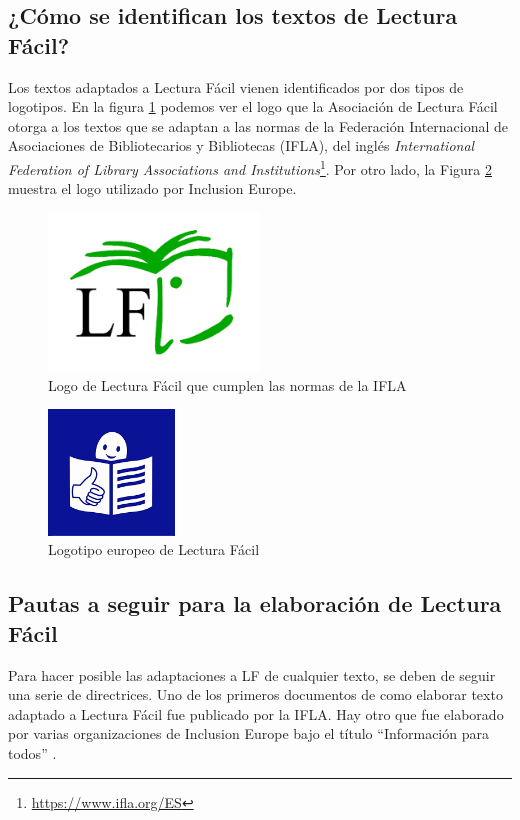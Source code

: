 \subsection{¿Cómo se identifican los textos de Lectura Fácil?}
Los textos adaptados a Lectura Fácil vienen identificados por dos tipos de logotipos. En la figura \ref{fig:IFLA} podemos ver el logo que la Asociación de Lectura Fácil otorga a los textos que se adaptan a las normas de la Federación Internacional de Asociaciones de Bibliotecarios y Bibliotecas (IFLA), del inglés \textit{International Federation of Library Associations and Institutions}\footnote{\href{https://www.ifla.org/ES}{https://www.ifla.org/ES}}. Por otro lado, la Figura  \ref{fig:logoEuropeo} muestra el logo utilizado por Inclusion Europe.
\begin{figure}[htb]
\centering
	\includegraphics[width=0.5\textwidth]{Imagenes/Logos/indice}
	\caption{Logo de Lectura Fácil que cumplen las normas de la IFLA}
	\label{fig:IFLA}
\end{figure} 
\begin{figure}[htb]
	\centering
	\includegraphics[width=0.3\textwidth]{Imagenes/Logos/indice2}
	\caption{Logotipo europeo de Lectura Fácil}
	\label{fig:logoEuropeo}
\end{figure} 

\subsection{Pautas a seguir para la elaboración de Lectura Fácil}
Para hacer posible las adaptaciones a LF de cualquier texto, se deben de seguir una serie de directrices. Uno de los primeros documentos de como elaborar texto adaptado a Lectura Fácil fue publicado por la IFLA. Hay otro que fue elaborado por varias organizaciones de Inclusion Europe bajo el título ``Información para todos'' \citep{InformacionParaTodos}.

